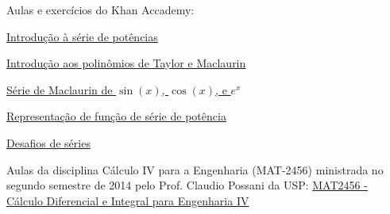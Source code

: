 Aulas e exercícios do Khan Accademy:
\begin{listlinks}
  \item \href{https://pt.khanacademy.org/math/calculus-home/series-calc/power-series-intro-calc/v/power-series-radius-interval-convergence}{Introdução à série de potências}
  \item \href{https://pt.khanacademy.org/math/calculus-home/series-calc/taylor-series-calc/v/maclaurin-and-taylor-series-intuition        }{Introdução aos polinômios de Taylor e Maclaurin}
  \item \href{https://pt.khanacademy.org/math/calculus-home/series-calc/maclaurin-taylor-calc/v/cosine-taylor-series-at-0-maclaurin       }{Série de Maclaurin de $\sin(x)$, $\cos(x)$, e $e^x$}
  \item \href{https://pt.khanacademy.org/math/calculus-home/series-calc/power-series-calc/v/function-as-a-geometric-series                }{Representação de função de série de potência}
  \item \href{https://pt.khanacademy.org/math/calculus-home/series-calc/challenge-exercises-series-calc/e/convergence-tests-challenge     }{Desafios de séries}
\end{listlinks}

Aulas da disciplina Cálculo IV para a Engenharia (MAT-2456)
ministrada no segundo semestre de 2014 pelo Prof. Claudio Possani da USP:
\href{https://www.youtube.com/playlist?list=PLxI8Can9yAHeOiMYCBlkyCALloROQ58OY}{MAT2456 - Cálculo Diferencial e Integral para Engenharia IV}

